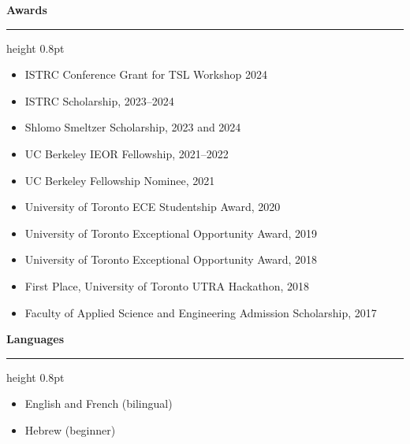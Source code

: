 \documentclass[10pt]{article}
\newcommand{\cvsection}[1]{%
  \vspace{0.7em}%
  {\large\bfseries #1}\par
  \vspace{0.15em}%
  {\color{SectionRule}\hrule height 0.8pt}%
  \vspace{0.35em}%
}
\begin{document}
\cvsection{Awards}
\begin{itemize}
  \item ISTRC Conference Grant for TSL Workshop 2024
  \item ISTRC Scholarship, 2023--2024
  \item Shlomo Smeltzer Scholarship, 2023 and 2024
  \item UC Berkeley IEOR Fellowship, 2021--2022
  \item UC Berkeley Fellowship Nominee, 2021
  \item University of Toronto ECE Studentship Award, 2020
  \item University of Toronto Exceptional Opportunity Award, 2019
  \item University of Toronto Exceptional Opportunity Award, 2018
  \item First Place, University of Toronto UTRA Hackathon, 2018
  \item Faculty of Applied Science and Engineering Admission Scholarship, 2017
\end{itemize}

\cvsection{Languages}
\begin{itemize}
  \item English and French (bilingual)
  \item Hebrew (beginner)
\end{itemize}
\end{document}
